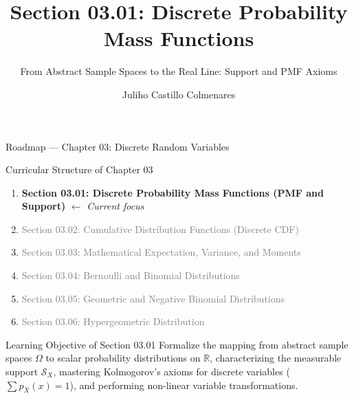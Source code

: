 \documentclass[10pt, aspectratio=169]{beamer}
\title[Discrete Probability Mass Functions]{Section 03.01: Discrete Probability Mass Functions}
\subtitle{From Abstract Sample Spaces to the Real Line: Support and PMF Axioms}
\author[J. Castillo Colmenares]{Juliho Castillo Colmenares}
\institute{Tecnológico de Monterrey}
\date{\vspace{-2.0cm}}
\begin{document}
\begin{frame}[plain]
  \vspace{-0.5cm}
  \titlepage
\end{frame}

\begin{frame}{Roadmap — Chapter 03: Discrete Random Variables}
  \begin{block}{Curricular Structure of Chapter 03}
    \footnotesize
    \begin{enumerate}\itemsep=0.08cm
      \item \textbf{\textcolor{TecRojo}{Section 03.01: Discrete Probability Mass Functions (PMF and Support)}} $\leftarrow$ \emph{Current focus}
      \item \textcolor{gray}{Section 03.02: Cumulative Distribution Functions (Discrete CDF)}
      \item \textcolor{gray}{Section 03.03: Mathematical Expectation, Variance, and Moments}
      \item \textcolor{gray}{Section 03.04: Bernoulli and Binomial Distributions}
      \item \textcolor{gray}{Section 03.05: Geometric and Negative Binomial Distributions}
      \item \textcolor{gray}{Section 03.06: Hypergeometric Distribution}
    \end{enumerate}
  \end{block}
  \vspace{-0.05cm}
  \pause
  \begin{alertblock}{Learning Objective of Section 03.01}
    \footnotesize
    Formalize the mapping from abstract sample spaces $\Omega$ to scalar probability distributions on $\mathbb{R}$, characterizing the measurable support $\mathcal{S}_X$, mastering Kolmogorov's axioms for discrete variables ($\sum p_X(x)=1$), and performing non-linear variable transformations.
  \end{alertblock}
\end{frame}
\end{document}

